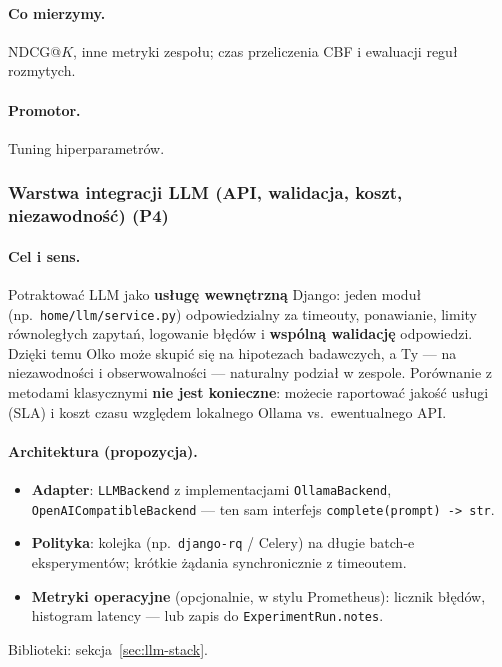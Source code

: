 \documentclass[a4paper,11pt]{article}
\newcommand{\code}[1]{\texttt{\small #1}}
\begin{document}
\paragraph{Co mierzymy.}
NDCG@$K$, inne metryki zespołu; czas przeliczenia CBF i ewaluacji reguł rozmytych.

\paragraph{Promotor.}
Tuning hiperparametrów.

\subsubsection{Warstwa integracji LLM (API, walidacja, koszt, niezawodność) (\textbf{P4})}

\paragraph{Cel i sens.}
Potraktować LLM jako \textbf{usługę wewnętrzną} Django: jeden moduł (np.\ \code{home/llm/service.py}) odpowiedzialny za timeouty, ponawianie, limity równoległych zapytań, logowanie błędów i \textbf{wspólną walidację} odpowiedzi. Dzięki temu Olko może skupić się na hipotezach badawczych, a Ty --- na niezawodności i obserwowalności --- naturalny podział w zespole. Porównanie z metodami klasycznymi \textbf{nie jest konieczne}: możecie raportować jakość usługi (SLA) i koszt czasu względem lokalnego Ollama vs.\ ewentualnego API.

\paragraph{Architektura (propozycja).}
\begin{itemize}[leftmargin=1.5em,itemsep=1pt]
  \item \textbf{Adapter}: \code{LLMBackend} z implementacjami \code{OllamaBackend}, \code{OpenAICompatibleBackend} --- ten sam interfejs \code{complete(prompt) -> str}.
  \item \textbf{Polityka}: kolejka (np.\ \code{django-rq} / Celery) na długie batch-e eksperymentów; krótkie żądania synchronicznie z timeoutem.
  \item \textbf{Metryki operacyjne} (opcjonalnie, w stylu Prometheus): licznik błędów, histogram latency --- lub zapis do \code{ExperimentRun.notes}.
\end{itemize}
Biblioteki: sekcja~\ref{sec:llm-stack}.
\end{document}
